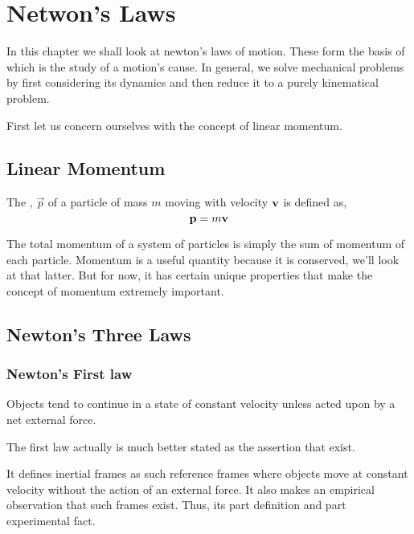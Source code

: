 \chapter{Netwon's Laws}

In this chapter we shall look at newton's laws of motion. These form the basis of  which is the 
study of a motion's cause. In general, we solve mechanical problems by first considering its 
dynamics and then reduce it to a purely kinematical problem.

First let us concern ourselves with the concept of linear momentum.

\section{Linear Momentum}

\begin{definition}
    The , \(\vec{p}\) of a particle of mass \(m\) moving 
    with velocity \(\boldsymbol{\mathbf{v}}\) is defined as,
    \[\boldsymbol{\mathbf{p}} = m\boldsymbol{\mathbf{v}}\] 
\end{definition}

The total momentum of a system of particles is simply the sum of momentum of each
particle. Momentum is a useful quantity because it is conserved,
we'll look at that latter. But for now, it has certain unique properties 
that make the concept of momentum extremely important.

\section{Newton's Three Laws}

\subsection{Newton's First law}

\begin{axioms}
    \ii Objects tend to continue in a state of constant
    velocity unless acted upon by a net external force.
\end{axioms}

The first law actually is much better stated as the 
assertion that  exist.

It defines inertial frames as such reference frames where 
objects move at constant velocity without the action of an external force.
It also makes an empirical observation that such frames exist. 
Thus, its part definition and part experimental fact.

